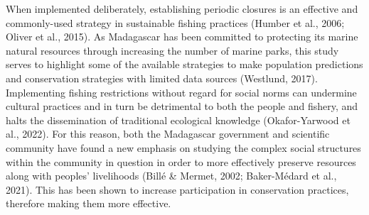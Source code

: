 \documentclass[
  12pt,
]{article}
\begin{document}
When implemented deliberately, establishing periodic closures is an effective and commonly-used strategy in sustainable fishing practices (Humber et al., 2006; Oliver et al., 2015). As Madagascar has been committed to protecting its marine natural resources through increasing the number of marine parks, this study serves to highlight some of the available strategies to make population predictions and conservation strategies with limited data sources (Westlund, 2017). Implementing fishing restrictions without regard for social norms can undermine cultural practices and in turn be detrimental to both the people and fishery, and halts the dissemination of traditional ecological knowledge (Okafor-Yarwood et al., 2022). For this reason, both the Madagascar government and scientific community have found a new emphasis on studying the complex social structures within the community in question in order to more effectively preserve resources along with peoples' livelihoods (Billé \& Mermet, 2002; Baker-Médard et al., 2021). This has been shown to increase participation in conservation practices, therefore making them more effective.
\end{document}
